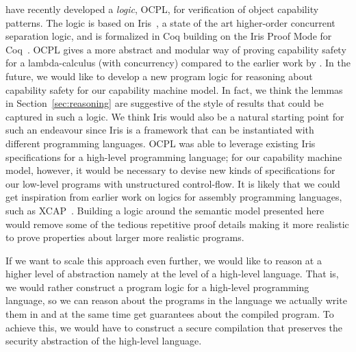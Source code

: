 \documentclass[format=acmsmall, review=true, screen=true]{acmart}
\newenvironment{toplas}{}{}
\begin{document}
\citet{swasey:2017} have recently developed a \emph{logic}, OCPL, for verification
of object capability patterns. The logic is based on
Iris~\citep{iris,iris2,iris3}, a state of the art higher-order concurrent
separation logic, and is formalized in Coq building on the Iris Proof Mode for
Coq~\citep{ipm}. OCPL gives a more abstract and modular way of proving
capability safety for a lambda-calculus (with concurrency) compared to the
earlier work by \citet{Devriese:2016ObjCap}.
\begin{toplas}
In the future, we would like to develop a new program logic for
reasoning about capability safety for our capability machine model. In fact,
we think the lemmas in Section~\ref{sec:reasoning} are suggestive of the style
of results that could be captured in such a logic. We think Iris would also be
a natural starting point for such an endeavour since Iris is a
framework that can be instantiated with different programming languages. OCPL
was able to leverage existing Iris specifications for a high-level programming language;
for our capability machine model, however, it would be necessary to devise new
kinds of specifications for our low-level programs with unstructured
control-flow. It is likely that we could get inspiration from earlier work on
logics for assembly programming languages, such as XCAP~\citep{xcap}.
Building a logic around the semantic model presented here would remove some of the tedious repetitive proof details making it more realistic to prove properties about larger more realistic programs.

If we want to scale this approach even further, we would like to reason at a higher level of abstraction namely at the level of a high-level language.
That is, we would rather construct a program logic for a high-level programming language, so we can reason about the programs in the language we actually write them in and at the same time get guarantees about the compiled program.
To achieve this, we would have to construct a secure compilation \citep{patrignani_secure_compilation_2019} that preserves the security abstraction of the high-level language.
\end{toplas}
\end{document}
